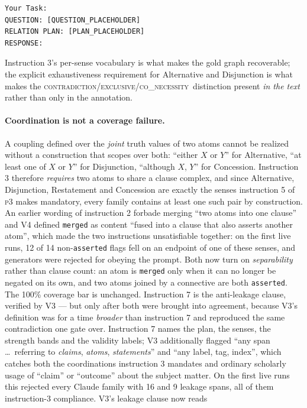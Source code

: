 \documentclass[11pt]{article}
\newcommand{\cCon}{\textsc{contradiction}}
\newcommand{\cExc}{\textsc{exclusive}}
\newcommand{\cCoN}{\textsc{co\_necessity}}
\begin{document}
\begin{small}
\begin{verbatim}
Your Task:
QUESTION: [QUESTION_PLACEHOLDER]
RELATION PLAN: [PLAN_PLACEHOLDER]
RESPONSE:
\end{verbatim}
\end{small}

Instruction 3's per-sense vocabulary is what makes the gold graph recoverable; the explicit
exhaustiveness requirement for Alternative and Disjunction is what makes the
\cCon/\cExc/\cCoN\ distinction present \emph{in the text} rather than only in the annotation.

\paragraph{Coordination is not a coverage failure.}
\label{sec:p4rationale}
A coupling defined over the \emph{joint} truth values of two atoms cannot be realized without a
construction that scopes over both: ``either $X$ or $Y$'' for Alternative, ``at least one of
$X$ or $Y$'' for Disjunction, ``although $X$, $Y$'' for Concession. Instruction 3 therefore
\emph{requires} two atoms to share a clause complex, and since Alternative, Disjunction,
Restatement and Concession are exactly the senses instruction 5 of \textsc{p3} makes mandatory,
every family contains at least one such pair by construction. An earlier wording of instruction 2
forbade merging ``two atoms into one clause'' and V4 defined \texttt{merged} as content ``fused
into a clause that also asserts another atom'', which made the two instructions unsatisfiable
together: on the first live runs, 12 of 14 non-\texttt{asserted} flags fell on an endpoint of one
of these senses, and generators were rejected for obeying the prompt. Both now turn on
\emph{separability} rather than clause count: an atom is \texttt{merged} only when it can no
longer be negated on its own, and two atoms joined by a connective are both \texttt{asserted}.
The 100\% coverage bar is unchanged.
Instruction 7 is the anti-leakage clause, verified by V3 --- but only after both were brought
into agreement, because V3's definition was for a time \emph{broader} than instruction 7 and
reproduced the same contradiction one gate over. Instruction 7 names the plan, the senses, the
strength bands and the validity labels; V3 additionally flagged ``any span \dots\ referring to
\emph{claims}, \emph{atoms}, \emph{statements}'' and ``any label, tag, index'', which catches
both the coordinations instruction 3 mandates and ordinary scholarly usage of ``claim'' or
``outcome'' about the subject matter. On the first live runs this rejected every Claude family
with 16 and 9 leakage spans, all of them instruction-3 compliance. V3's leakage clause now reads
\end{document}
